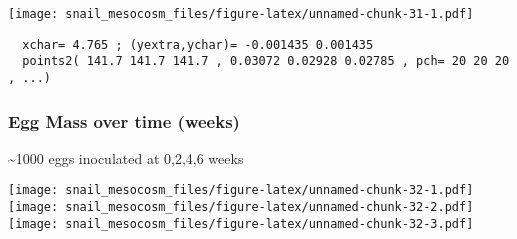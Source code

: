 \documentclass[10,portrait]{article}
\begin{document}
\texttt{[image: snail\_mesocosm\_files/figure-latex/unnamed-chunk-31-1.pdf]}

\begin{verbatim}
  xchar= 4.765 ; (yextra,ychar)= -0.001435 0.001435 
  points2( 141.7 141.7 141.7 , 0.03072 0.02928 0.02785 , pch= 20 20 20 , ...) 
\end{verbatim}

\subsubsection{Egg Mass over time
(weeks)}\label{egg-mass-over-time-weeks}

\textasciitilde{}1000 eggs inoculated at 0,2,4,6 weeks

\texttt{[image: snail\_mesocosm\_files/figure-latex/unnamed-chunk-32-1.pdf]}
\texttt{[image: snail\_mesocosm\_files/figure-latex/unnamed-chunk-32-2.pdf]}
\texttt{[image: snail\_mesocosm\_files/figure-latex/unnamed-chunk-32-3.pdf]}

\printbibliography
\end{document}

